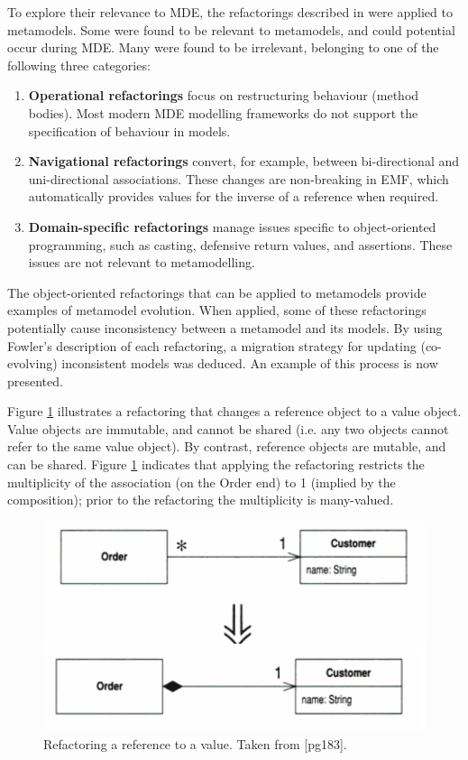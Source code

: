 To explore their relevance to MDE, the refactorings described in \cite{fowler99refactoring} were applied to metamodels. Some were found to be relevant to metamodels, and could potential occur during MDE. Many were found to be irrelevant, belonging to one of the following three categories:

\begin{enumerate}
	\item \textbf{Operational refactorings} focus on restructuring behaviour (method bodies). Most modern MDE modelling frameworks do not support the specification of behaviour in models.
	\item \textbf{Navigational refactorings} convert, for example, between bi-directional and uni-directional associations. These changes are non-breaking in EMF, which automatically provides values for the inverse of a reference when required.
	\item \textbf{Domain-specific refactorings} manage issues specific to object-oriented programming, such as casting, defensive return values, and assertions. These issues are not relevant to metamodelling.
\end{enumerate}

The object-oriented refactorings that can be applied to metamodels provide examples of metamodel evolution. When applied, some of these refactorings potentially cause inconsistency between a metamodel and its models. By using Fowler's description of each refactoring, a migration strategy for updating (co-evolving) inconsistent models was deduced. An example of this process is now presented.

Figure \ref{fig:refactoring} illustrates a refactoring that changes a reference object to a value object. Value objects are immutable, and cannot be shared (i.e. any two objects cannot refer to the same value object). By contrast, reference objects are mutable, and can be shared. Figure \ref{fig:refactoring} indicates that applying the refactoring restricts the multiplicity of the association (on the Order end) to 1 (implied by the composition); prior to the refactoring the multiplicity is many-valued.

\begin{figure}[htbp]
  \begin{center}
    \leavevmode
    \includegraphics[scale=0.5]{4.Analysis/exemplar_refactoring.pdf}
  \end{center}
  \caption{Refactoring a reference to a value. Taken from \cite{fowler99refactoring}[pg183].}
  \label{fig:refactoring}
\end{figure}

